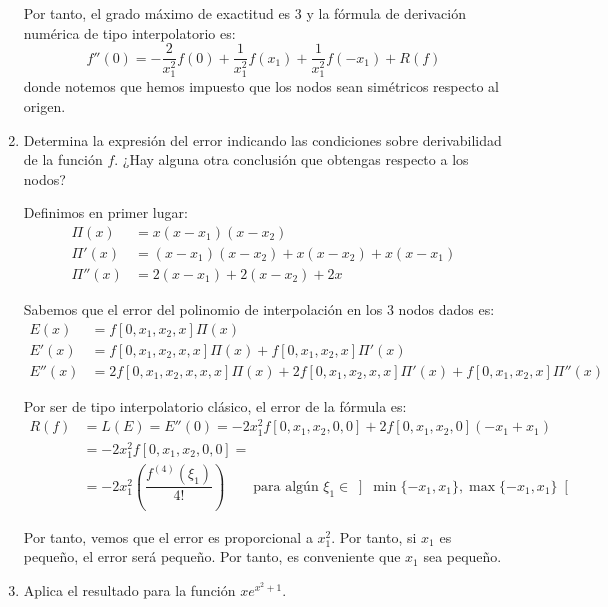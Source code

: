 \begin{ejercicio}
\begin{enumerate}
        Por tanto, el grado máximo de exactitud es $3$ y la fórmula de derivación numérica de tipo interpolatorio es:
        \begin{equation*}
            f''(0) = -\dfrac{2}{x_1^2}f(0) + \dfrac{1}{x_1^2}f(x_1) + \dfrac{1}{x_1^2}f(-x_1) + R(f)
        \end{equation*}
        donde notemos que hemos impuesto que los nodos sean simétricos respecto al origen.

        \item Determina la expresión del error indicando las condiciones sobre derivabilidad de la función $f$. ¿Hay alguna otra conclusión que obtengas respecto a los nodos?
        
        Definimos en primer lugar:
        \begin{align*}
            \Pi(x) &= x(x-x_1)(x-x_2)\\
            \Pi'(x) &= (x-x_1)(x-x_2) + x(x-x_2) + x(x-x_1)\\
            \Pi''(x) &= 2(x-x_1) + 2(x-x_2) + 2x
        \end{align*}

        Sabemos que el error del polinomio de interpolación en los $3$ nodos dados es:
        \begin{align*}
            E(x) &= f[0, x_1, x_2, x]\Pi(x)\\
            E'(x) &= f[0, x_1, x_2, x, x]\Pi(x) + f[0, x_1, x_2, x]\Pi'(x)\\
            E''(x) &= 2f[0, x_1, x_2, x, x, x]\Pi(x) + 2f[0, x_1, x_2, x, x]\Pi'(x) + f[0, x_1, x_2, x]\Pi''(x)
        \end{align*}

        Por ser de tipo interpolatorio clásico, el error de la fórmula es:
        \begin{align*}
            R(f) &= L(E) = E''(0) = -2x_1^2f[0, x_1, x_2, 0, 0]+2f[0, x_1, x_2, 0]\left(-x_1+x_1\right)\\
            &= -2x_1^2f[0, x_1, x_2, 0, 0]=\\&= -2x_1^2\left(\dfrac{f^{(4)}(\xi_1)}{4!}\right)\qquad \text{para algún }\xi_1\in\left]\min\{-x_1,x_1\},\max\{-x_1,x_1\}\right[
        \end{align*}

    
        Por tanto, vemos que el error es proporcional a $x_1^2$. Por tanto, si $x_1$ es pequeño, el error será pequeño. Por tanto, es conveniente que $x_1$ sea pequeño.
        
        \item Aplica el resultado para la función $x e^{x^2 + 1}$.
        

\end{enumerate}
\end{ejercicio}

